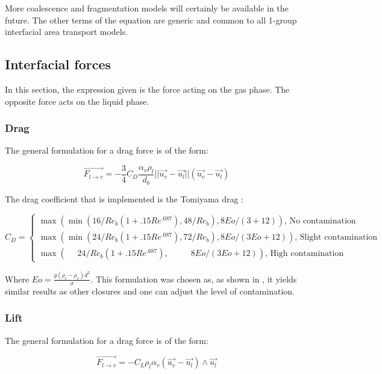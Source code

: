 More coalescence and fragmentation models will certainly be available in the future. The other terms of the equation are generic and common to all 1-group interfacial area transport models.


\subsection{Interfacial forces}

In this section, the expression given is the force acting on the gas phase. The opposite force acts on the liquid phase.

\subsubsection{Drag}

The general formulation for a drag force is of the form:

\begin{equation}
\overrightarrow{F_{l\rightarrow v}}= - \frac{3}{4} C_D \frac{\alpha_v\rho_l}{d_b} ||\overrightarrow{u_v}-\overrightarrow{u_l}|| (\overrightarrow{u_v}-\overrightarrow{u_l})
\end{equation}

The drag coefficient that is implemented is the Tomiyama drag 
\cite{Tomiyama1998}:

\begin{equation}
C_D = \begin{cases} \max(\min(16/Re_b(1+.15Re^{.687}), 48/Re_b), 8Eo/(3+12)) \text{, No contamination}\\
	\max(\min(24/Re_b(1+.15Re^{.687}), 72/Re_b), 8Eo/(3Eo+12)) \text{, Slight contamination}\\
	\max(~~~~~~24/Re_b(1+.15Re^{.687}), ~~~~~~~~~~~~8Eo/(3Eo+12)) \text{, High contamination} \end{cases}
\end{equation}

Where $Eo = \frac{g(\rho_l-\rho_v)d^2}{\sigma}$. This formulation was chosen as, as shown in \cite{Sugrue2017}, it yields similar results as other closures and one can adjust the level of contamination.

\subsubsection{Lift}

The general formulation for a drag force is of the form:

\begin{equation}
	\overrightarrow{F_{l\rightarrow v}}= - C_L \rho_l \alpha_v (\overrightarrow{u_v}-\overrightarrow{u_l}) \wedge \overrightarrow{u_l}
\end{equation}

